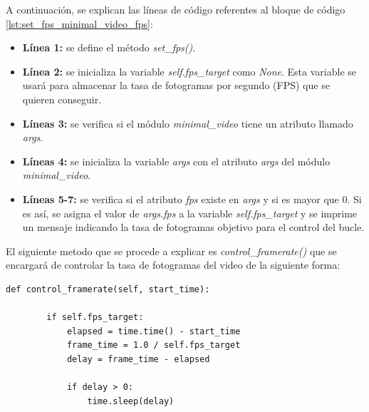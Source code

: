 A continuación, se explican las líneas de código referentes al bloque de código \ref{lst:set_fps_minimal_video_fps}:
\begin{itemize}
    \item \textbf{Línea 1:} se define el método \textit{set\_fps()}.
    \item \textbf{Línea 2:} se inicializa la variable \textit{self.fps\_target} como \textit{None}. Esta variable se usará para almacenar la tasa de fotogramas por segundo (FPS) que se quieren conseguir.
    \item \textbf{Líneas 3:} se verifica si el módulo \textit{minimal\_video} tiene un atributo llamado \textit{args}.
    \item \textbf{Líneas 4:} se inicializa la variable \textit{args} con el atributo \textit{args} del módulo \textit{minimal\_video}.
    \item \textbf{Líneas 5-7:} se verifica si el atributo \textit{fps} existe en \textit{args} y si es mayor que 0. Si es así, se asigna el valor de \textit{args.fps} a la variable \textit{self.fps\_target} y se imprime un mensaje indicando la tasa de fotogramas objetivo para el control del bucle.
\end{itemize}
\vspace{\baselineskip}

El siguiente metodo que se procede a explicar es \textit{control\_framerate()} que se encargará de controlar la tasa de fotogramas del video de la siguiente forma:
\begin{lstlisting}[style=pythonstyle, caption={Método control\_framerate() de \textit{Minimal\_Video\_FPS}}, label={lst:control_framerate_minimal_video_fps}]
def control_framerate(self, start_time):

        if self.fps_target:
            elapsed = time.time() - start_time
            frame_time = 1.0 / self.fps_target
            delay = frame_time - elapsed 
            
            if delay > 0:
                time.sleep(delay)
\end{lstlisting}
\vspace{\baselineskip}

